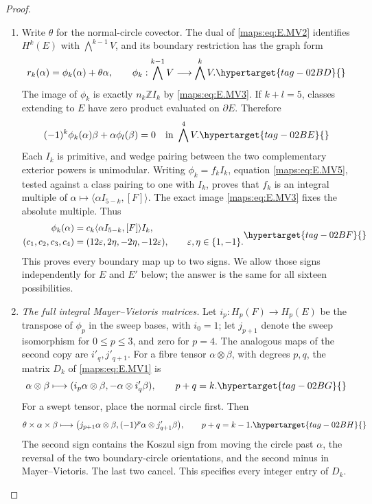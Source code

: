 \documentclass[11pt,a4paper]{article}
\numberwithin{equation}{section}
\theoremstyle{definition}
\begin{document}
\begin{proof}
\begin{enumerate}[label=\arabic*.,leftmargin=*]
\item Write $\theta$ for the normal-circle covector. The dual of
\eqref{maps:eq:E.MV2} identifies $H^k(E)$ with $\bigwedge^{k-1}V$, and
its boundary restriction has the graph form
\begin{equation}
 r_k(\alpha)=\phi_k(\alpha)+\theta\alpha,
 \qquad
 \phi_k:\bigwedge^{k-1}V\longrightarrow\bigwedge^kV.
 \hypertarget{tag-02BD}{}\label{maps:eq:E.MV4}
\end{equation}
The image of $\phi_k$ is exactly $n_k\mathbb Z I_k$ by
\eqref{maps:eq:E.MV3}. If $k+l=5$, classes extending to $E$ have zero
product evaluated on $\partial E$. Therefore
\begin{equation}
 (-1)^k\phi_k(\alpha)\beta+
                    \alpha\phi_l(\beta)=0
 \quad\text{in }\bigwedge^4V.
 \hypertarget{tag-02BE}{}\label{maps:eq:E.MV5}
\end{equation}
Each $I_k$ is primitive, and wedge pairing between the two
complementary exterior powers is unimodular. Writing
$\phi_k=f_k I_k$, equation \eqref{maps:eq:E.MV5}, tested against a class
pairing to one with $I_k$, proves that $f_k$ is an integral
multiple of $\alpha\mapsto\langle\alpha I_{5-k},[F]\rangle$.
The exact image \eqref{maps:eq:E.MV3} fixes the absolute multiple. Thus
\begin{equation}
 \begin{split}
 \phi_k(\alpha)&=c_k
       \langle\alpha I_{5-k},[F]\rangle I_k,\\
 (c_1,c_2,c_3,c_4)&=(12\varepsilon,2\eta,-2\eta,-12\varepsilon),
 \qquad \varepsilon,\eta\in\{1,-1\}.
 \end{split}
 \hypertarget{tag-02BF}{}\label{maps:eq:E.MV6}
\end{equation}
This proves every boundary map up to two signs. We allow those
signs independently for $E$ and $E'$ below; the answer is the
same for all sixteen possibilities.

\item \emph{The full integral Mayer--Vietoris matrices.}
Let $i_p:H_p(F)\to H_p(E)$ be the transpose of $\phi_p$ in
the sweep bases, with $i_0=1$; let $j_{p+1}$ denote the sweep
isomorphism for $0\leq p\leq3$, and zero for $p=4$.
The analogous maps of the second copy are $i'_q,j'_{q+1}$.
For a fibre tensor $\alpha\otimes\beta$, with degrees $p,q$,
the matrix $D_k$ of \eqref{maps:eq:E.MV1} is
\begin{equation}
 \alpha\otimes\beta\longmapsto
  (i_p\alpha\otimes\beta,-\alpha\otimes i'_q\beta),
 \qquad p+q=k.
 \hypertarget{tag-02BG}{}\label{maps:eq:E.MV7}
\end{equation}
For a swept tensor, place the normal circle first. Then
\begin{equation}
 \theta\times\alpha\times\beta\longmapsto
 \bigl(j_{p+1}\alpha\otimes\beta,
                 (-1)^p\alpha\otimes j'_{q+1}\beta\bigr),
 \qquad p+q=k-1.
 \hypertarget{tag-02BH}{}\label{maps:eq:E.MV8}
\end{equation}
The second sign contains the Koszul sign from moving the circle
past $\alpha$, the reversal of the two boundary-circle
orientations, and the second minus in Mayer--Vietoris. The last
two cancel. This specifies every integer entry of $D_k$.


\end{enumerate}
\end{proof}
\end{document}
